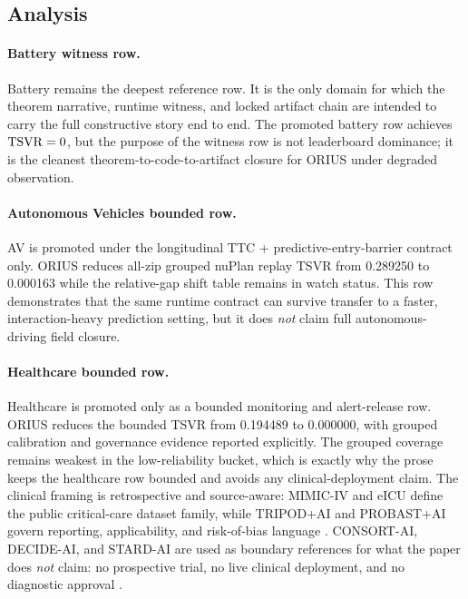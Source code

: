 

\subsection{Analysis}

\paragraph{Battery witness row.}
Battery remains the deepest reference row.  It is the only domain for which the
theorem narrative, runtime witness, and locked artifact chain are intended to carry
the full constructive story end to end.  The promoted battery row achieves
$\mathrm{TSVR} = 0$, but the purpose of the witness row is not leaderboard dominance; it is
the cleanest theorem-to-code-to-artifact closure for ORIUS under degraded
observation.

\paragraph{Autonomous Vehicles bounded row.}
AV is promoted under the longitudinal TTC + predictive-entry-barrier contract only.
ORIUS reduces all-zip grouped nuPlan replay TSVR from 0.289250 to 0.000163 while the
relative-gap shift table remains in watch status.  This row demonstrates that the
same runtime contract can survive transfer to a faster, interaction-heavy prediction
setting, but it does \emph{not} claim full autonomous-driving field closure.

\paragraph{Healthcare bounded row.}
Healthcare is promoted only as a bounded monitoring and alert-release row.  ORIUS
reduces the bounded TSVR from 0.194489 to 0.000000, with grouped calibration and
governance evidence reported explicitly.  The grouped coverage remains weakest in
the low-reliability bucket, which is exactly why the prose keeps the healthcare row
bounded and avoids any clinical-deployment claim.
The clinical framing is retrospective and source-aware: MIMIC-IV and eICU
define the public critical-care dataset family, while TRIPOD+AI and PROBAST+AI
govern reporting, applicability, and risk-of-bias language
\cite{johnson2023mimiciv,physionet2024mimiciv31,pollard2018eicu,collins2024tripodai,moons2025probastai}.
CONSORT-AI, DECIDE-AI, and STARD-AI are used as boundary references for what the
paper does \emph{not} claim: no prospective trial, no live clinical deployment,
and no diagnostic approval
\cite{liu2020consortai,vasey2022decideai,stardai2025}.

